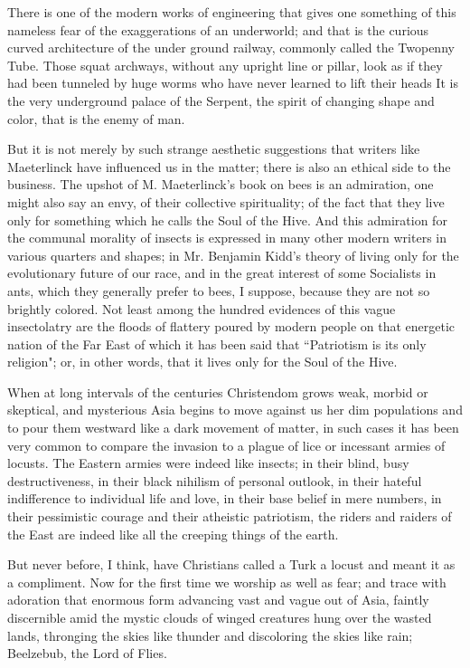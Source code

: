 \documentclass[final,10pt,letterpaper,twocolumn,openany]{book}
\begin{document}
There is one of the modern works of engineering that gives one
something of this nameless fear of the exaggerations of an underworld;
and that is the curious curved architecture of the under ground railway,
commonly called the Twopenny Tube. Those squat archways, without any
upright line or pillar, look as if they had been tunneled by huge worms
who have never learned to lift their heads It is the very underground
palace of the Serpent, the spirit of changing shape and color, that is the
enemy of man.

But it is not merely by such strange aesthetic suggestions that writers
like Maeterlinck have influenced us in the matter; there is also an ethical
side to the business. The upshot of M. Maeterlinck's book on bees is an
admiration, one might also say an envy, of their collective spirituality; of
the fact that they live only for something which he calls the Soul of the
Hive. And this admiration for the communal morality of insects is
expressed in many other modern writers in various quarters and shapes; in
Mr. Benjamin Kidd's theory of living only for the evolutionary future of
our race, and in the great interest of some Socialists in ants, which they
generally prefer to bees, I suppose, because they are not so brightly
colored. Not least among the hundred evidences of this vague insectolatry
are the floods of flattery poured by modern people on that energetic nation
of the Far East of which it has been said that ``Patriotism is its only
religion"; or, in other words, that it lives only for the Soul of the Hive.

When at long intervals of the centuries Christendom grows weak, morbid
or skeptical, and mysterious Asia begins to move against us her dim
populations and to pour them westward like a dark movement of matter, in
such cases it has been very common to compare the invasion to a plague
of lice or incessant armies of locusts. The Eastern armies were indeed like
insects; in their blind, busy destructiveness, in their black nihilism of
personal outlook, in their hateful indifference to individual life and love,
in their base belief in mere numbers, in their pessimistic courage and their
atheistic patriotism, the riders and raiders of the East are indeed like all the
creeping things of the earth. 

But never before, I think, have Christians
called a Turk a locust and meant it as a compliment. Now for the first time
we worship as well as fear; and trace with adoration that enormous form
advancing vast and vague out of Asia, faintly discernible amid the mystic
clouds of winged creatures hung over the wasted lands, thronging the skies
like thunder and discoloring the skies like rain; Beelzebub, the Lord of
Flies.
\end{document}
